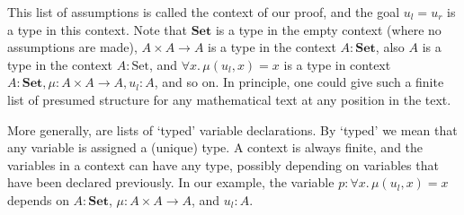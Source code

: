 This list of assumptions is called the context of our proof, and the goal $u_l=u_r$ is a type in this context. 
Note that $\mathbf{Set}$ is a type in the empty context (where no assumptions are made), $A\times A\to A$ is a type in the context $A:\mathbf{Set}$, also $A$ is a type in the context $A:\mathrm{Set}$, and $\forall x.\,\mu(u_l,x)=x$ is a type in context $A:\mathbf{Set},\mu:A\times A\to A,u_l:A$, and so on.
In principle, one could give such a finite list of presumed structure for any mathematical text at any position in the text.

More generally,  are lists of `typed' variable declarations. By `typed' we mean that any variable is assigned a (unique) type. A context is always finite, and the variables in a context can have any type, possibly depending on variables that have been declared previously. In our example, the variable $p:\forall x.\,\mu(u_l,x)=x$ depends on $A:\mathbf{Set}$, $\mu:A\times A\to A$, and $u_l:A$. 
